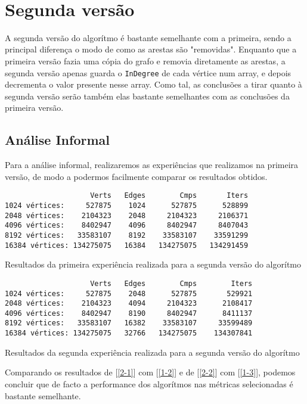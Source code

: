 \\
\chapter{Segunda versão}

A segunda versão do algorítmo é bastante semelhante com a
primeira, sendo a principal diferença o modo de como as
arestas são "removidas". Enquanto que a primeira versão
fazia uma cópia do grafo e removia diretamente as arestas, a
segunda versão apenas guarda o \verb|InDegree| de cada
vértice num array, e depois decrementa o valor presente
nesse array. Como tal, as conclusões a tirar quanto à
segunda versão serão também elas bastante semelhantes com as
conclusões da primeira versão.


\section{Análise Informal}
Para a análise informal, realizaremos as experiências
que realizamos na primeira versão, de modo a podermos
facilmente comparar os resultados obtidos.

\begin{listing}[H]
	\centering
	\begin{verbatim}
                    Verts	Edges	     Cmps	    Iters
1024 vértices:     527875	 1024	   527875	   528899
2048 vértices:    2104323	 2048	  2104323	  2106371
4096 vértices:    8402947	 4096	  8402947	  8407043
8192 vértices:   33583107	 8192	 33583107	 33591299
16384 vértices: 134275075	16384	134275075	134291459
  \end{verbatim}
	\caption{Resultados da primeira experiência realizada para
  a segunda versão do algorítmo}
  \label{2-1}
\end{listing}

\begin{listing}[H]
	\centering
	\begin{verbatim}
                    Verts	Edges	     Cmps	     Iters
1024 vértices:     527875	 2048	   527875	    529921
2048 vértices:    2104323	 4094	  2104323	   2108417
4096 vértices:    8402947	 8190	  8402947	   8411137
8192 vértices:   33583107	16382	 33583107	  33599489
16384 vértices: 134275075	32766	134275075	 134307841
  \end{verbatim}
	\caption{Resultados da segunda experiência realizada para
  a segunda versão do algorítmo}
  \label{2-2}
\end{listing}

Comparando os resultados de [\ref{2-1}] com [\ref{1-2}] e de
[\ref{2-2}] com [\ref{1-3}], podemos concluir que de facto a
performance dos algorítmos nas métricas selecionadas é
bastante semelhante.

